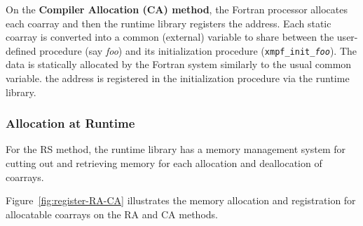 On the {\bf Compiler Allocation (CA) method},
the Fortran processor allocates each coarray and then the runtime library
registers the address.
Each static coarray is converted into a common (external) variable to share 
between the user-defined procedure (say {\it foo}) and its initialization
procedure ({\tt xmpf\_init\_{\it foo}}). The data is statically allocated
by the Fortran system similarly to the usual common variable.
the address is registered in the initialization procedure via the runtime
library.


\subsubsection{Allocation at Runtime}

For the RS method, the runtime library has a memory management system for
cutting out and retrieving memory for each allocation and deallocation of 
coarrays.

Figure~\ref{fig:register-RA-CA} illustrates the memory allocation and registration
for allocatable coarrays on the RA and CA methods. 


